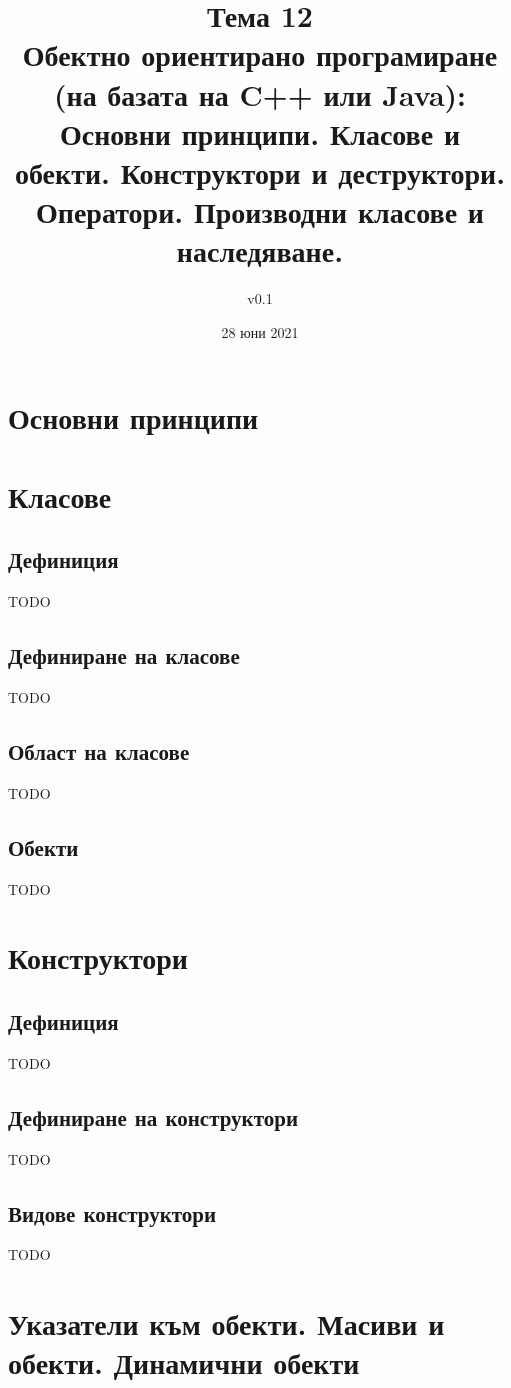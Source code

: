 \documentclass[fleqn,12pt]{article}
\title{Тема 12\\Обектно ориентирано програмиране (на базата на C++ или Java): Основни
принципи. Класове и обекти. Конструктори и деструктори. Оператори.
Производни класове и наследяване.}
\author{v0.1}
\date{28 юни 2021}
\begin{document}
\maketitle

\tableofcontents

\section{Основни принципи}

\section{Класове}
\subsection{Дефиниция}
TODO

\subsection{Дефиниране на класове}
TODO

\subsection{Област на класове}
TODO

\subsection{Обекти}
TODO


\section{Конструктори}
\subsection{Дефиниция}
TODO

\subsection{Дефиниране на конструктори}
TODO

\subsection{Видове конструктори}
TODO


\section{Указатели към обекти. Масиви и обекти. Динамични обекти}
\end{document}
